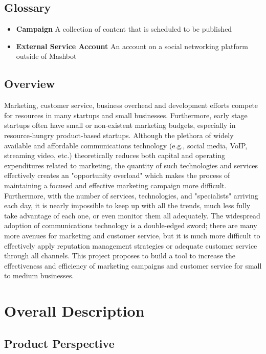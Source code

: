\documentclass{report}
\begin{document}
\subsection{Glossary} %

\begin{itemize}

\item \textbf{Campaign} A collection of content that is scheduled to be
published
\item \textbf{External Service Account} An account on a social
  networking platform outside of Mashbot

\end{itemize}

\subsection{Overview} %

Marketing, customer service, business overhead and development efforts
compete for resources in many startups and small
businesses. Furthermore, early stage startups often have small or
non-existent marketing budgets, especially in resource-hungry
product-based startups. Although the plethora of widely available and
affordable communications technology (e.g., social media, VoIP,
streaming video, etc.) theoretically reduces both capital and
operating expenditures related to marketing, the quantity of such
technologies and services effectively creates an "opportunity
overload" which makes the process of maintaining a focused and
effective marketing campaign more difficult. Furthermore, with the
number of services, technologies, and "specialists" arriving each day,
it is nearly impossible to keep up with all the trends, much less
fully take advantage of each one, or even monitor them all
adequately. The widespread adoption of communications technology is a
double-edged sword; there are many more avenues for marketing and
customer service, but it is much more difficult to effectively apply
reputation management strategies or adequate customer service through
all channels. This project proposes to build a tool to increase the
effectiveness and efficiency of marketing campaigns and customer
service for small to medium businesses.

\section{Overall Description}
     \subsection{Product Perspective} %
\end{document}
